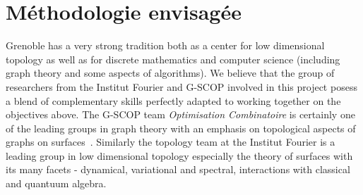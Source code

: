 \documentclass[14pt,fleqn]{article}
\begin{document}
\section{Méthodologie envisagée}

Grenoble  has 
a very strong tradition both 
as a center for low dimensional topology 
as well as for discrete mathematics and computer science
(including graph theory and some aspects of algorithms). 
We believe that the group of researchers from the Institut Fourier and G-SCOP 
involved
in this project posess a blend of complementary skills 
perfectly adapted
to working together on the objectives above.
The G-SCOP team \emph{Optimisation Combinatoire} is certainly one of the leading groups in graph theory with an emphasis on topological aspects of graphs on surfaces~\cite{es-wqpp-18}. 
Similarly the topology team at the Institut Fourier is a leading group in low dimensional topology 
especially the theory of surfaces 
with its many facets 
- dynamical, variational and spectral,
 interactions with classical and quantuum algebra.
 
%

\vspace{.25in}
\end{document}
